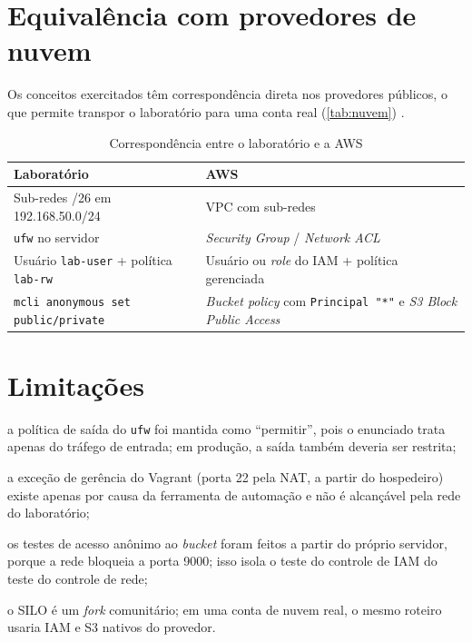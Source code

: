 \section{Equivalência com provedores de nuvem}

Os conceitos exercitados têm correspondência direta nos provedores públicos, o que
permite transpor o laboratório para uma conta real (\autoref{tab:nuvem})
\cite{nist800145,aws-s3-bpa}.

\begin{table}[htbp]
  \centering
  \caption{Correspondência entre o laboratório e a AWS}\label{tab:nuvem}
  \begin{tabular}{L{0.42\textwidth}L{0.48\textwidth}}
    \hline
    \textbf{Laboratório} & \textbf{AWS} \\
    \hline
    Sub-redes /26 em 192.168.50.0/24 & VPC com sub-redes \\
    \texttt{ufw} no servidor & \textit{Security Group} / \textit{Network ACL} \\
    Usuário \texttt{lab-user} + política \texttt{lab-rw} & Usuário ou \textit{role} do IAM + política gerenciada \\
    \texttt{mcli anonymous set public/private} & \textit{Bucket policy} com \texttt{Principal "*"} e \textit{S3 Block Public Access} \\
    \hline
  \end{tabular}
\end{table}

\section{Limitações}

\begin{alineas}
  \item a política de saída do \texttt{ufw} foi mantida como ``permitir'', pois o enunciado
    trata apenas do tráfego de entrada; em produção, a saída também deveria ser restrita;
  \item a exceção de gerência do Vagrant (porta 22 pela NAT, a partir do hospedeiro) existe
    apenas por causa da ferramenta de automação e não é alcançável pela rede do laboratório;
  \item os testes de acesso anônimo ao \textit{bucket} foram feitos a partir do próprio
    servidor, porque a rede bloqueia a porta 9000; isso isola o teste do controle de IAM
    do teste do controle de rede;
  \item o SILO é um \textit{fork} comunitário; em uma conta de nuvem real, o mesmo roteiro
    usaria IAM e S3 nativos do provedor.
\end{alineas}

